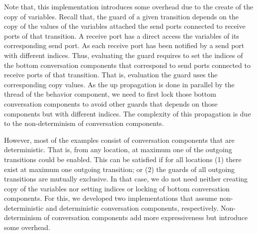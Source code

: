 Note that, this implementation introduces some overhead due to the create of the copy of variables. Recall that, the guard of a given transition depends on the copy of the values of the variables attached the send ports connected to receive ports of that transition. A receive port has a direct access the variables of its corresponding send port. As each receive port has been notified by a send port with different indices. Thus, evaluating the guard requires to set the indices of the bottom conversation components that correspond to send ports connected to receive ports of that transition. That is, evaluation the guard uses the corresponding copy values. As the up propagation is done in parallel by the thread of the behavior component, we need to first lock those bottom conversation components to avoid other guards that depends on those components but with different indices. The complexity of this propagation is due to the non-determinism of conversation components. 


However, most of the examples consist of conversation components that are deterministic. That is, from any location, at maximum one of the outgoing transitions could be enabled. This can be satisfied if for all locations (1) there exist at maximum one outgoing transition; or (2) the guards of all outgoing transitions are mutually exclusive. In that case, we do not need neither creating copy of the variables nor setting indices or locking of bottom conversation components.
For this, we developed two implementations that assume non-deterministic and deterministic conversation components, respectively. Non-determinism of conversation components add more expressiveness but introduce some overhead.  


\begin{figure}
\scalebox{0.5}{}
\end{figure}



